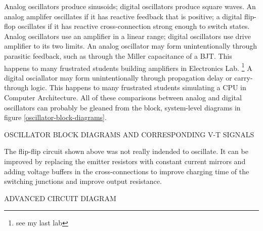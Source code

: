 \documentclass[titlepage, letterpaper, 10.5pt]{article}
\begin{document}
Analog oscillators produce sinusoids; digital oscillators produce square waves.
An analog amplifer oscillates if it has reactive feedback that is positive;
a digital flip-flop oscillates if it has reactive cross-connection strong enough to switch states.
Analog oscillators use an amplifier in a linear range; digital oscillators use drive
amplifier to its two limits.
An analog oscillator may form unintentionally through parasitic feedback,
such as through the Miller capacitance of a BJT.
This happens to many frustrated students building amplifiers in Electronics Lab.
\footnote{see my last lab}
A digital osciallator may form unintentionally through propagation delay or carry-through
logic. This happens to many frustrated students simulating a CPU in Computer Architecture.
All of these comparisons between analog and digital oscillators can probably be gleaned
from the block, system-level diagrams in figure \ref{oscillator-block-diagrams}.

OSCILLATOR BLOCK DIAGRAMS AND CORRESPONDING V-T SIGNALS

The flip-flip circuit shown above was not really indended to oscillate.
It can be improved by replacing the emitter resistors with constant current mirrors
and adding voltage buffers in the cross-connections to improve charging time of the
switching junctions and improve output resistance.

ADVANCED CIRCUIT DIAGRAM
\end{document}
